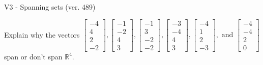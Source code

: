 \begin{exercise}
  \begin{exerciseTitle}V3 - Spanning sets (ver. 489)\end{exerciseTitle}
  \begin{exerciseStatement}
    Explain why the vectors \(\left[\begin{array}{r}
-4 \\
4 \\
2 \\
-2
\end{array}\right] , \left[\begin{array}{r}
-1 \\
-2 \\
4 \\
3
\end{array}\right] , \left[\begin{array}{r}
-1 \\
3 \\
-2 \\
-2
\end{array}\right] , \left[\begin{array}{r}
-3 \\
-4 \\
4 \\
3
\end{array}\right] , \left[\begin{array}{r}
-4 \\
1 \\
2 \\
-3
\end{array}\right] , \text{ and } \left[\begin{array}{r}
-4 \\
-4 \\
2 \\
0
\end{array}\right]\) span or don't span \(\mathbb{R}^4\). 
	



\end{exerciseStatement}
\end{exercise}
